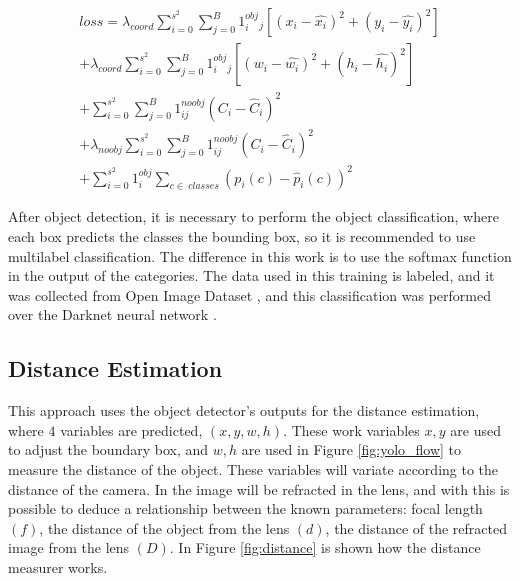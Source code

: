 \begin{equation}
\label{eq:loss}
\begin{aligned}
    loss = \lambda_{coord}\sum_{i=0}^{s^2}\sum_{j=0}^{B}1^{obj}_i_j\left [ \left ( x_i - \hat{x_i} \right )^2  + (y_i-\hat{y_i})^2 \right ] \\ 
    + \lambda_{coord}\sum_{i=0}^{s^2}\sum_{j=0}^{B}1^{obj}_i_j\left [ \left ( w_i - \hat{w_i} \right )^2  + (h_i-\hat{h_i})^2 \right ] \\
+    \sum_{i=0}^{s^2}\sum_{j=0}^{B}1^{noobj}_{ij}\left ( C_i - \hat{C}_i \right )^2\\
+  \lambda_{noobj}\sum_{i=0}^{s^2}\sum_{j=0}^{B}1^{noobj}_{ij}\left ( C_i - \hat{C}_i \right )^2\\
+     \sum_{i=0}^{s^2}1^{obj}_i \sum_{c\in~classes} \left ( p_i\left ( c \right )-\hat{p}_i\left ( c \right )\right )^2
    \end{aligned}
\end{equation}

After object detection, it is necessary to perform the object classification, where each box predicts the classes the bounding box, so it is recommended to use multilabel classification. The difference in this work is to use the softmax function in the output of the categories. The data used in this training is labeled, and it was collected from Open Image Dataset \cite{krasin2017openimages}, and this classification was performed over the Darknet neural network \cite{redmon2013darknet}.

\subsection{Distance Estimation}

This approach uses the object detector's outputs for the distance estimation, where $4$ variables are predicted, $(x, y, w, h)$. These work variables $x,y$ are used to adjust the boundary box, and $w, h$ are used in Figure \ref{fig:yolo_flow} to measure the distance of the object. These variables will variate according to the distance of the camera.  In \cite{cao2013circle} the image will be refracted in the lens, and with this is possible to deduce a relationship between the known parameters: focal length $(f)$, the distance of the object from the lens $(d)$, the distance of the refracted image from the lens $(D)$. In Figure \ref{fig:distance} is shown how the distance measurer works. 


